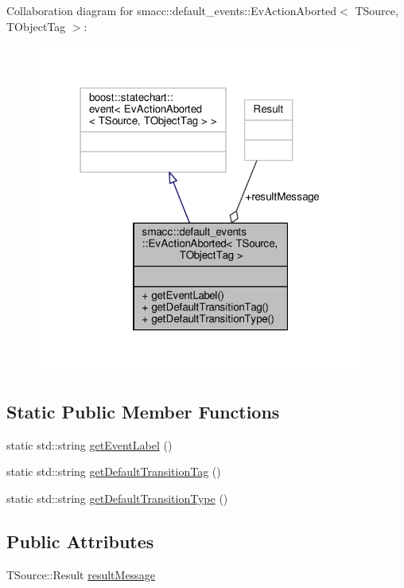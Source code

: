 Collaboration diagram for smacc\+:\+:default\+\_\+events\+:\+:Ev\+Action\+Aborted$<$ T\+Source, T\+Object\+Tag $>$\+:\nopagebreak
\begin{figure}[H]
\begin{center}
\leavevmode
\includegraphics[width=306pt]{structsmacc_1_1default__events_1_1EvActionAborted__coll__graph}
\end{center}
\end{figure}
\subsection*{Static Public Member Functions}
\begin{DoxyCompactItemize}
\item 
static std\+::string \hyperlink{structsmacc_1_1default__events_1_1EvActionAborted_ae3613f85ce29214e061ea2677a4d28e1}{get\+Event\+Label} ()
\item 
static std\+::string \hyperlink{structsmacc_1_1default__events_1_1EvActionAborted_ad31e4437f0d30bf59589c28590a1edaa}{get\+Default\+Transition\+Tag} ()
\item 
static std\+::string \hyperlink{structsmacc_1_1default__events_1_1EvActionAborted_abb8137180081b5cce72398b81cc95fc5}{get\+Default\+Transition\+Type} ()
\end{DoxyCompactItemize}
\subsection*{Public Attributes}
\begin{DoxyCompactItemize}
\item 
T\+Source\+::\+Result \hyperlink{structsmacc_1_1default__events_1_1EvActionAborted_a0cd103e20d922ab5039022b67fffd5f7}{result\+Message}
\end{DoxyCompactItemize}


